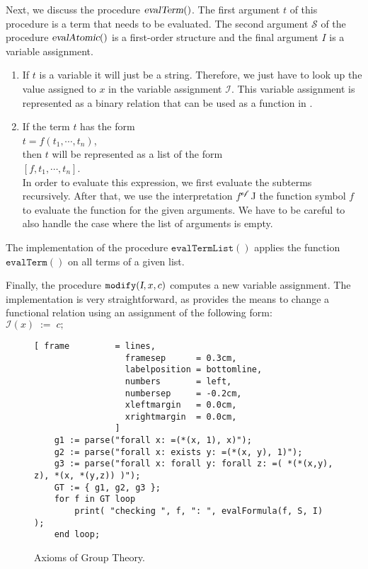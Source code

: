 Next, we discuss the procedure $\textsl{evalTerm}()$.  The first argument $t$ of this
procedure is a term that needs to be evaluated.
The second argument  $\mathcal{S}$ of the procedure $\textsl{evalAtomic}()$ is a
first-order structure and the final argument $I$ is a variable assignment.
\begin{enumerate}
\item If $t$ is a variable it will just be a string.
      Therefore, we just have to look up the value assigned to $x$ in the variable assignment
      $\mathcal{I}$.  This variable assignment is represented as a binary relation that
      can be used as a function in \setl.
\item If the term $t$ has the form
      \\[0.2cm]
      \hspace*{1.3cm}
      $t = f(t_1,\cdots,t_n)$,
      \\[0.2cm]
      then $t$ will be represented as a list of the form
      \\[0.2cm]
      \hspace*{1.3cm}
      $[ f, t_1, \cdots, t_n ]$.
      \\[0.2cm]
      In order to evaluate this expression, we first evaluate the subterms recursively.
      After that, we use the interpretation
      $f^\mathcal{of}$ J the function symbol  $f$ to evaluate the function for the given
      arguments.  We have to be careful to also handle the case where the list of arguments
      is empty.
\end{enumerate}
The implementation of the procedure  $\texttt{evalTermList}()$ applies the function
$\mathtt{evalTerm}()$ on all terms of a given list.

Finally, the procedure  $\texttt{modify}(\textsl{I},x,c)$ computes a new variable
assignment.  The implementation is very straightforward, as \setl{} provides the means to
change a functional relation using an assignment of the following form:
\\[0.2cm]
\hspace*{1.3cm}
$\mathcal{I}(x) \;\mathtt{:=}\; c;$

\begin{figure}[!ht]
\centering
\begin{Verbatim}[ frame         = lines, 
                  framesep      = 0.3cm, 
                  labelposition = bottomline,
                  numbers       = left,
                  numbersep     = -0.2cm,
                  xleftmargin   = 0.0cm,
                  xrightmargin  = 0.0cm,
                ]
    g1 := parse("forall x: =(*(x, 1), x)");
    g2 := parse("forall x: exists y: =(*(x, y), 1)");
    g3 := parse("forall x: forall y: forall z: =( *(*(x,y), z), *(x, *(y,z)) )");
    GT := { g1, g2, g3 };
    for f in GT loop
        print( "checking ", f, ": ", evalFormula(f, S, I) );
    end loop;
\end{Verbatim}
\vspace*{-0.3cm}
\caption{Axioms of Group Theory.}
\label{fig:gruppen-theorie.stl}
\end{figure}

